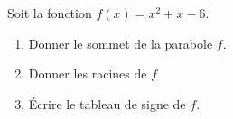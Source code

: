 
\begin{exercice}\label{exosmath-0288}

    Soit la fonction \( f(x)=x^2+x-6\).
    \begin{enumerate}
        \item
            Donner le sommet de la parabole $f$.
        \item
            Donner les racines de \( f\)
        \item
            Écrire le tableau de signe de \( f\).
    \end{enumerate}

\end{exercice}
